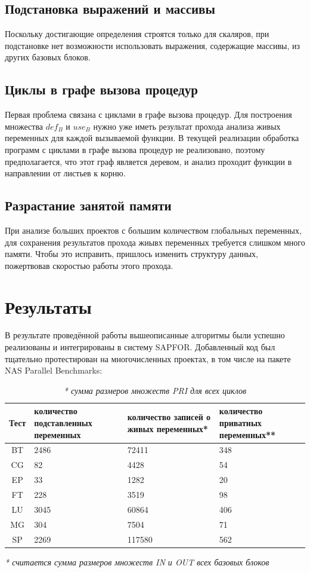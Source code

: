 \documentclass{article}
\begin{document}
\subsection*{Подстановка выражений и массивы}
    Поскольку достигающие определения строятся только для скаляров, при подстановке нет возможности использовать выражения, содержащие массивы, из других базовых блоков.

\subsection*{Циклы в графе вызова процедур}
    Первая проблема связана с циклами в графе вызова процедур. Для построения множества $def_B$ и $use_B$ нужно уже иметь результат прохода анализа живых переменных для каждой вызываемой функции. В текущей реализации обработка программ с циклами в графе вызова процедур не реализовано, 
    поэтому предполагается, что этот граф является деревом, и анализ проходит функции в направлении от листьев к корню.

\subsection*{Разрастание занятой памяти}
    При анализе больших проектов с большим количеством глобальных переменных, для сохранения результатов прохода жиывх переменных требуется слишком много памяти. Чтобы это исправить, пришлось изменить структуру данных, пожертвовав скоростью работы этого прохода.

\section{Результаты}
    В результате проведённой работы вышеописанные алгоритмы были успешно реализованы и интегрированы в систему SAPFOR.
    Добавленный код был тщательно протестирован на многочисленных проектах, в том числе на пакете NAS Parallel Benchmarks\cite{npb}:
\\

\begin{table}[h!]
    \centering
\begin{tabular}{ | c || p{2.5cm} | p{3.5cm} | p{2.5cm} |  }
 \hline
 Тест& количество подставленных переменных & количество записей о живых переменных* &количество приватных переменных**\\
 \hline
 BT & 2486 & 72411 & 348 \\
 \hline
CG & 82 & 4428 & 54 \\
\hline
EP & 33 & 1282 & 20 \\
\hline
FT & 228 & 3519 & 98 \\
\hline
LU & 3045 & 60864 & 406 \\
\hline
MG & 304 & 7504 & 71 \\
\hline
SP & 2269 & 117580 & 562 \\
 \hline
\end{tabular}
\caption*{\textit{* считается сумма размеров множеств IN и OUT всех базовых блоков }}
\caption*{\textit{* сумма размеров множеств PRI для всех циклов }}
\end{table}


\printbibliography %
\end{document}
